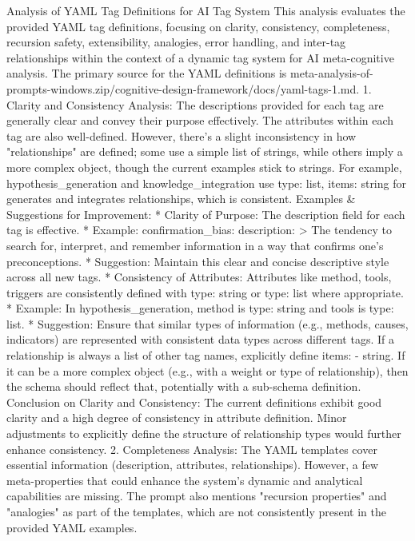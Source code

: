 {Analysis of YAML Tag Definitions for AI Tag System
This analysis evaluates the provided YAML tag definitions, focusing on clarity, consistency, completeness, recursion safety, extensibility, analogies, error handling, and inter-tag relationships within the context of a dynamic tag system for AI meta-cognitive analysis. The primary source for the YAML definitions is meta-analysis-of-prompts-windows.zip/cognitive-design-framework/docs/yaml-tags-1.md.
1. Clarity and Consistency
Analysis: The descriptions provided for each tag are generally clear and convey their purpose effectively. The attributes within each tag are also well-defined. However, there's a slight inconsistency in how "relationships" are defined; some use a simple list of strings, while others imply a more complex object, though the current examples stick to strings. For example, hypothesis_generation and knowledge_integration use type: list, items: string for generates and integrates relationships, which is consistent.
Examples & Suggestions for Improvement:
 * Clarity of Purpose: The description field for each tag is effective.
   * Example: confirmation_bias: description: > The tendency to search for, interpret, and remember information in a way that confirms one’s preconceptions.
   * Suggestion: Maintain this clear and concise descriptive style across all new tags.
 * Consistency of Attributes: Attributes like method, tools, triggers are consistently defined with type: string or type: list where appropriate.
   * Example: In hypothesis_generation, method is type: string and tools is type: list.
   * Suggestion: Ensure that similar types of information (e.g., methods, causes, indicators) are represented with consistent data types across different tags. If a relationship is always a list of other tag names, explicitly define items: - string. If it can be a more complex object (e.g., with a weight or type of relationship), then the schema should reflect that, potentially with a sub-schema definition.
Conclusion on Clarity and Consistency: The current definitions exhibit good clarity and a high degree of consistency in attribute definition. Minor adjustments to explicitly define the structure of relationship types would further enhance consistency.
2. Completeness
Analysis: The YAML templates cover essential information (description, attributes, relationships). However, a few meta-properties that could enhance the system's dynamic and analytical capabilities are missing. The prompt also mentions "recursion properties" and "analogies" as part of the templates, which are not consistently present in the provided YAML examples.
}
